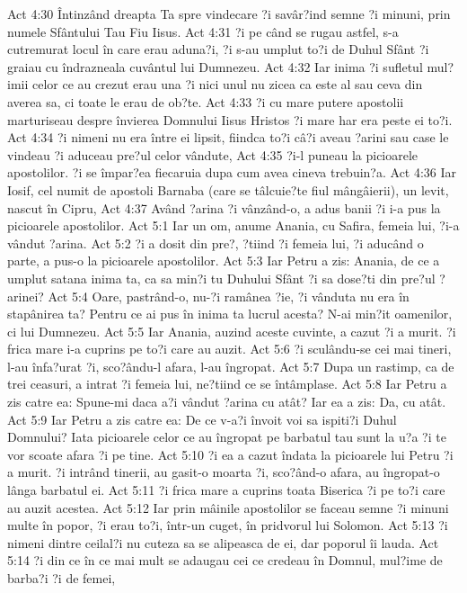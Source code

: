 Act 4:30  Întinzând dreapta Ta spre vindecare ?i savâr?ind semne ?i minuni, prin numele Sfântului Tau Fiu Iisus.
Act 4:31  ?i pe când se rugau astfel, s-a cutremurat locul în care erau aduna?i, ?i s-au umplut to?i de Duhul Sfânt ?i graiau cu îndrazneala cuvântul lui Dumnezeu.
Act 4:32  Iar inima ?i sufletul mul?imii celor ce au crezut erau una ?i nici unul nu zicea ca este al sau ceva din averea sa, ci toate le erau de ob?te.
Act 4:33  ?i cu mare putere apostolii marturiseau despre învierea Domnului Iisus Hristos ?i mare har era peste ei to?i.
Act 4:34  ?i nimeni nu era între ei lipsit, fiindca to?i câ?i aveau ?arini sau case le vindeau ?i aduceau pre?ul celor vândute,
Act 4:35  ?i-l puneau la picioarele apostolilor. ?i se împar?ea fiecaruia dupa cum avea cineva trebuin?a.
Act 4:36  Iar Iosif, cel numit de apostoli Barnaba (care se tâlcuie?te fiul mângâierii), un levit, nascut în Cipru,
Act 4:37  Având ?arina ?i vânzând-o, a adus banii ?i i-a pus la picioarele apostolilor.
Act 5:1  Iar un om, anume Anania, cu Safira, femeia lui, ?i-a vândut ?arina.
Act 5:2  ?i a dosit din pre?, ?tiind ?i femeia lui, ?i aducând o parte, a pus-o la picioarele apostolilor.
Act 5:3  Iar Petru a zis: Anania, de ce a umplut satana inima ta, ca sa min?i tu Duhului Sfânt ?i sa dose?ti din pre?ul ?arinei?
Act 5:4  Oare, pastrând-o, nu-?i ramânea ?ie, ?i vânduta nu era în stapânirea ta? Pentru ce ai pus în inima ta lucrul acesta? N-ai min?it oamenilor, ci lui Dumnezeu.
Act 5:5  Iar Anania, auzind aceste cuvinte, a cazut ?i a murit. ?i frica mare i-a cuprins pe to?i care au auzit.
Act 5:6  ?i sculându-se cei mai tineri, l-au înfa?urat ?i, sco?ându-l afara, l-au îngropat.
Act 5:7  Dupa un rastimp, ca de trei ceasuri, a intrat ?i femeia lui, ne?tiind ce se întâmplase.
Act 5:8  Iar Petru a zis catre ea: Spune-mi daca a?i vândut ?arina cu atât? Iar ea a zis: Da, cu atât.
Act 5:9  Iar Petru a zis catre ea: De ce v-a?i învoit voi sa ispiti?i Duhul Domnului? Iata picioarele celor ce au îngropat pe barbatul tau sunt la u?a ?i te vor scoate afara ?i pe tine.
Act 5:10  ?i ea a cazut îndata la picioarele lui Petru ?i a murit. ?i intrând tinerii, au gasit-o moarta ?i, sco?ând-o afara, au îngropat-o lânga barbatul ei.
Act 5:11  ?i frica mare a cuprins toata Biserica ?i pe to?i care au auzit acestea.
Act 5:12  Iar prin mâinile apostolilor se faceau semne ?i minuni multe în popor, ?i erau to?i, într-un cuget, în pridvorul lui Solomon.
Act 5:13  ?i nimeni dintre ceilal?i nu cuteza sa se alipeasca de ei, dar poporul îi lauda.
Act 5:14  ?i din ce în ce mai mult se adaugau cei ce credeau în Domnul, mul?ime de barba?i ?i de femei,
